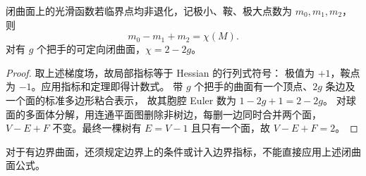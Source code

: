 \begin{proposition}[曲面上的临界点计数]
闭曲面上的光滑函数若临界点均非退化，记极小、鞍、极大点数为 $m_0,m_1,m_2$，则
\[
 m_0-m_1+m_2=\chi(M).
\]
对有 $g$ 个把手的可定向闭曲面，$\chi=2-2g$。
\end{proposition}
\begin{proof}



取上述梯度场，故局部指标等于 Hessian 的行列式符号：
极值为 $+1$，鞍点为 $-1$。应用指标和定理即得计数式。
带 $g$ 个把手的曲面有一个顶点、$2g$ 条边及一个面的标准多边形粘合表示，
故其胞腔 Euler 数为 $1-2g+1=2-2g$。
对球面的多面体分解，用连通平面图删除非树边，每删一边同时合并两个面，
$V-E+F$ 不变。最终一棵树有 $E=V-1$ 且只有一个面，故 $V-E+F=2$。
\end{proof}
对于有边界曲面，还须规定边界上的条件或计入边界指标，不能直接应用上述闭曲面公式。
